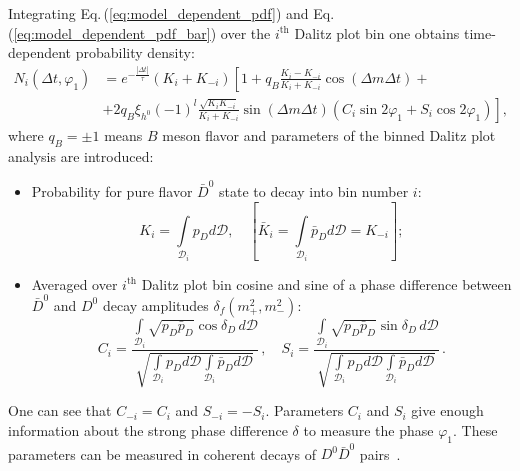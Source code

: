 \documentclass[preprint,aps,showpacs]{revtex4}
\begin{document}
Integrating Eq.\,(\ref{eq:model_dependent_pdf}) and Eq.\,(\ref{eq:model_dependent_pdf_bar}) over the $i^{\text{th}}$ Dalitz plot bin one obtains time-dependent probability density:
\begin{equation}\label{eq:master-formula}
 \begin{split}
  N_i\left(\Delta t,\varphi_1\right) &= e^{-\frac{\left|\Delta t\right|}{\tau}}\left(K_{i}+K_{-i}\right)\left[ 1 + q_{B}\frac{K_{i}-K_{-i}}{K_{i}+K_{-i}}\cos\left(\Delta m\Delta t\right)+\right.\\
  &\left.+2q_{B}\xi_{h^0}(-1)^l\frac{\sqrt{K_iK_{-i}}}{K_{i}+K_{-i}}\sin\left(\Delta m\Delta t\right)\left(C_i\sin2\varphi_1+S_i\cos2\varphi_1\right)\right],
 \end{split}
 \end{equation}
where $q_{B}=\pm1$ means $B$ meson flavor and parameters of the binned Dalitz plot analysis are introduced:
 \begin{itemize}
  \item Probability for pure flavor $\bar D^0$ state to decay into bin number $i$:
  \begin{equation}
   K_i = \int\limits_{\mathcal{D}_i}p_D d\mathcal{D},\quad \left[\bar K_i = \int\limits_{\mathcal{D}_i}\bar p_D d\mathcal{D} = K_{-i}\right];
  \end{equation}

  \item Averaged over $i^{\text{th}}$ Dalitz plot bin cosine and sine of a phase difference between $\bar D^0$ and $D^0$  decay amplitudes $\delta_f\left(m_+^2,m_-^2\right)$:
  \begin{equation}\label{cs}
  C_i=\frac{\int\limits_{\mathcal{D}_i}
            \sqrt{p_D\bar p_D}
            \cos\delta_D\,d\mathcal{D}
            }{\sqrt{
            \int\limits_{\mathcal{D}_i}p_D d\mathcal{D}
            \int\limits_{\mathcal{D}_i}\bar p_D d\mathcal{D}
            }}\,, \quad
  S_i=\frac{\int\limits_{\mathcal{D}_i}
            \sqrt{p_D\bar p_D}
            \sin\delta_D\,d\mathcal{D}
            }{\sqrt{
            \int\limits_{\mathcal{D}_i}p_D d\mathcal{D}
            \int\limits_{\mathcal{D}_i}\bar p_D d\mathcal{D}
            }}\,.
  \end{equation}
 \end{itemize}


One can see that $C_{-i} = C_i$ and $S_{-i} = -S_i$. Parameters $C_i$ and $S_i$ give enough information about the strong phase difference $\delta$ to measure the phase $\varphi_1$. These parameters can be measured in coherent decays of $D^0\bar D^0$ pairs~\cite{GGSZ,BPV,CLEO_phasees}.
\end{document}
